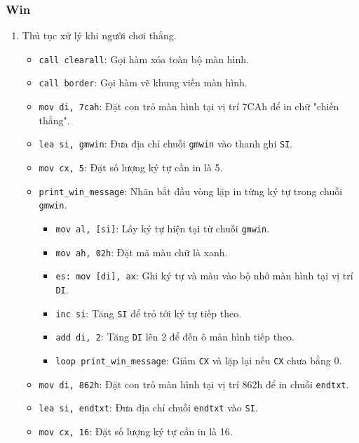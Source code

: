 \documentclass[12pt]{article}
\begin{document}
\subsubsection*{Win}
\begin{enumerate}[label=\textbf{\arabic*.}]
    \begin{figure}[H]
  \centering
  \texttt{[image: pics/win.png]}
\end{figure}
    \item \texttt{} Thủ tục xử lý khi người chơi thắng.
    
    \begin{itemize}
        \item \texttt{call clearall}: Gọi hàm xóa toàn bộ màn hình.
        \item \texttt{call border}: Gọi hàm vẽ khung viền màn hình.
        \item \texttt{mov di, 7cah}: Đặt con trỏ màn hình tại vị trí 7CAh để in chữ "chiến thắng".
        \item \texttt{lea si, gmwin}: Đưa địa chỉ chuỗi \texttt{gmwin} vào thanh ghi \texttt{SI}.
        \item \texttt{mov cx, 5}: Đặt số lượng ký tự cần in là 5.
        
        \item \texttt{print\_win\_message}: Nhãn bắt đầu vòng lặp in từng ký tự trong chuỗi \texttt{gmwin}.
        
        \begin{itemize}
            \item \texttt{mov al, [si]}: Lấy ký tự hiện tại từ chuỗi \texttt{gmwin}.
            \item \texttt{mov ah, 02h}: Đặt mã màu chữ là xanh.
            \item \texttt{es: mov [di], ax}: Ghi ký tự và màu vào bộ nhớ màn hình tại vị trí \texttt{DI}.
            \item \texttt{inc si}: Tăng \texttt{SI} để trỏ tới ký tự tiếp theo.
            \item \texttt{add di, 2}: Tăng \texttt{DI} lên 2 để đến ô màn hình tiếp theo.
            \item \texttt{loop print\_win\_message}: Giảm \texttt{CX} và lặp lại nếu \texttt{CX} chưa bằng 0.
        \end{itemize}

        \item \texttt{mov di, 862h}: Đặt con trỏ màn hình tại vị trí 862h để in chuỗi \texttt{endtxt}.
        \item \texttt{lea si, endtxt}: Đưa địa chỉ chuỗi \texttt{endtxt} vào \texttt{SI}.
        \item \texttt{mov cx, 16}: Đặt số lượng ký tự cần in là 16.


\end{itemize}
\end{enumerate}
\end{document}
